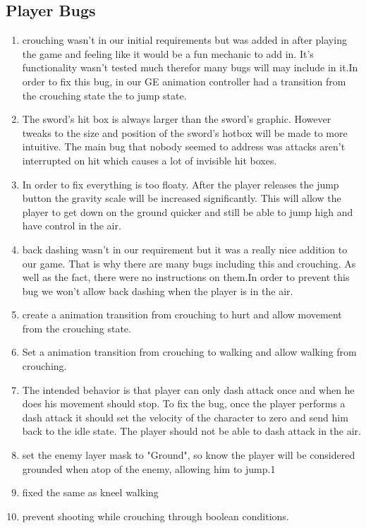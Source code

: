 \documentclass{article}
\begin{document}
\subsection*{Player Bugs}
\begin{enumerate}
	\item crouching wasn't in our initial requirements but was added in after playing the game and feeling like it would be a fun mechanic to add in. It's functionality wasn't tested much therefor many bugs will may include in it.In order to fix this bug, in our GE animation controller had a transition from the crouching state the to jump state. 
		\item The sword's hit box is always larger than the sword's graphic. However tweaks to the size and position of the sword's hotbox will be made to more intuitive. The main bug that nobody seemed to address was attacks aren't interrupted on hit which causes a lot of invisible hit boxes. 
			\item In order to fix everything is too floaty. After the player releases the jump button the gravity scale will be increased significantly. This will allow the player to get down on the ground quicker and still be able to jump high and have control in the air.
				\item back dashing  wasn't in our requirement  but it was a really nice addition to our game. That is why there are many bugs including this and crouching. As well as the fact, there were no instructions on them.In order to prevent this bug we won't allow back dashing when the player is in the air.
					\item create a animation transition from crouching to hurt and allow movement from the crouching state.
						\item Set a animation transition from crouching to walking and allow walking from crouching.
							\item The intended behavior is that player can only dash attack once and when he does his movement should stop. To fix the bug, once the player performs a dash attack it should set the velocity of the character to zero and send him back to the idle state. The player should not be able to dash attack in the air.
								\item set the enemy layer mask to "Ground", so know the player will be considered grounded when atop of the enemy, allowing him to jump.1
									\item fixed the same as kneel walking
										\item prevent shooting while crouching through boolean conditions.
\end{enumerate}
\end{document}
